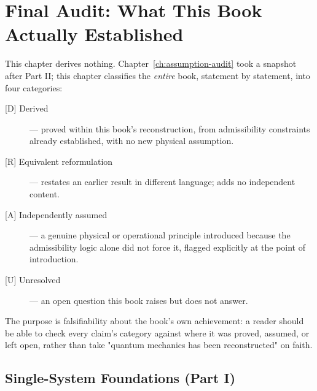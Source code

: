 \chapter{Final Audit: What This Book Actually Established}
\label{ch:final-audit}

This chapter derives nothing. Chapter~\ref{ch:assumption-audit} took a
snapshot after Part II; this chapter classifies the \emph{entire} book,
statement by statement, into four categories:

\begin{description}
\item[{[D] Derived}] — proved within this book's reconstruction, from
admissibility constraints already established, with no new physical
assumption.
\item[{[R] Equivalent reformulation}] — restates an earlier result in
different language; adds no independent content.
\item[{[A] Independently assumed}] — a genuine physical or operational
principle introduced because the admissibility logic alone did not force
it, flagged explicitly at the point of introduction.
\item[{[U] Unresolved}] — an open question this book raises but does not
answer.
\end{description}

The purpose is falsifiability about the book's own achievement: a reader
should be able to check every claim's category against where it was proved,
assumed, or left open, rather than take "quantum mechanics has been
reconstructed" on faith.

\section{Single-System Foundations (Part I)}

